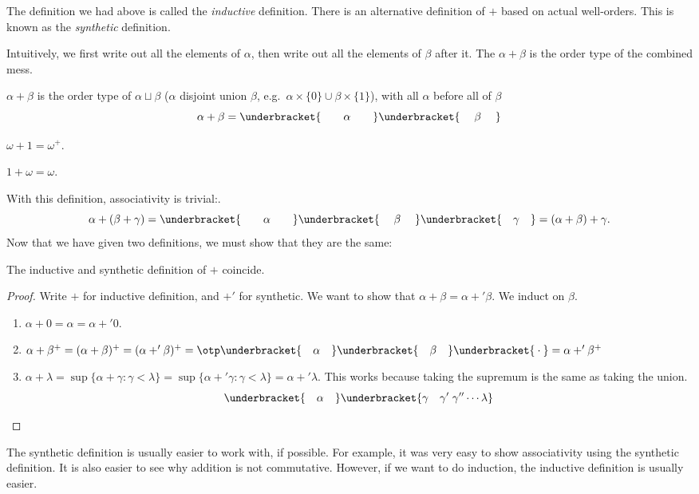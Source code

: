 \documentclass[a4paper]{article}
\begin{document}
The definition we had above is called the \emph{inductive} definition. There is an alternative definition of $+$ based on actual well-orders. This is known as the \emph{synthetic} definition.

Intuitively, we first write out all the elements of $\alpha$, then write out all the elements of $\beta$ after it. The $\alpha + \beta$ is the order type of the combined mess.

\begin{defi}
  $\alpha + \beta$ is the order type of $\alpha \sqcup \beta$ ($\alpha$ disjoint union $\beta$, e.g.\ $\alpha\times \{0\}\cup \beta\times \{1\}$), with all $\alpha$ before all of $\beta$
  \[
    \alpha + \beta = \underbracket{\quad\quad\vphantom{\beta}\alpha\vphantom{\beta}\quad\quad}\underbracket{\quad\;\beta\;\quad}
  \]
\end{defi}
\begin{eg}
  $\omega + 1 = \omega^+$.

  $1 + \omega = \omega$.
\end{eg}

With this definition, associativity is trivial:.
\[
  \alpha + (\beta + \gamma) = \underbracket{\quad\quad\vphantom{\beta}\alpha\vphantom{\beta}\quad\quad}\underbracket{\quad\;\beta\;\quad}\underbracket{\quad\gamma\quad} = (\alpha + \beta) + \gamma.
\]
Now that we have given two definitions, we must show that they are the same:
\begin{prop}
  The inductive and synthetic definition of $+$ coincide.
\end{prop}

\begin{proof}
  Write $+$ for inductive definition, and $+'$ for synthetic. We want to show that $\alpha + \beta = \alpha +' \beta$. We induct on $\beta$.

  \begin{enumerate}
    \item $\alpha + 0 = \alpha = \alpha +' 0$.
    \item $\alpha + \beta^+ = (\alpha + \beta)^+ = (\alpha +' \beta)^+ = \otp\underbracket{\quad\vphantom\beta\alpha\vphantom\beta\quad}\underbracket{\quad\beta\quad}\underbracket{\vphantom\beta\cdot\vphantom\beta} = \alpha +' \beta^+$
    \item $\alpha + \lambda = \sup\{\alpha + \gamma: \gamma < \lambda\} = \sup \{\alpha +' \gamma: \gamma < \lambda\} = \alpha +' \lambda$. This works because taking the supremum is the same as taking the union.
      \[
        \underbracket{\quad\vphantom\gamma\alpha\vphantom\gamma\quad}\underbracket{\gamma\quad\gamma'\;\gamma''\cdots \lambda}
      \]
  \end{enumerate}
\end{proof}
The synthetic definition is usually easier to work with, if possible. For example, it was very easy to show associativity using the synthetic definition. It is also easier to see why addition is not commutative. However, if we want to do induction, the inductive definition is usually easier.
\end{document}
